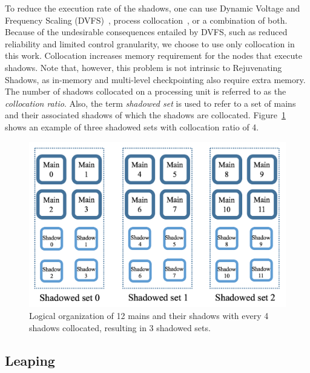 To reduce the execution rate of the shadows, one can use Dynamic Voltage and Frequency Scaling (DVFS)~\cite{cui_en7085151}, process collocation~\cite{cui_2016_scalcom}, or a combination of both. Because of the undesirable consequences entailed by DVFS, such as reduced reliability and limited control granularity, we choose to use only collocation in this work. %
Collocation increases memory requirement for the nodes that execute shadows. Note that, however, this problem is not intrinsic to Rejuvenating Shadows, as in-memory and multi-level checkpointing also require extra memory.
The number of shadows collocated on a processing unit is referred to as the \textit{collocation ratio}. Also, the term \textit{shadowed set} is used to refer to a set of mains and their associated shadows of which the shadows are collocated. Figure~\ref{fig:logical_org} shows an example of three shadowed sets with collocation ratio of 4.

\begin{figure}[!t]
  \begin{center}
      \includegraphics[width=\columnwidth]{figures/logical_org_3}
  \end{center}
  \vskip -0.25in
  \caption{Logical organization of 12 mains and their shadows with every 4 shadows collocated, resulting in 3 shadowed sets.}
  \label{fig:logical_org}
  \vskip -0.25in
\end{figure}

\subsection{Leaping}

